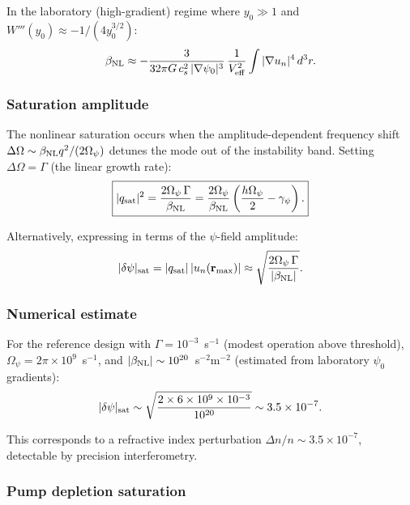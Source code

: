 \documentclass[12pt,aps,prd,twocolumn,superscriptaddress,nofootinbib]{revtex4-2}
\newcommand{\Opsi}{\Omega_\psi}
\newcommand{\gpsi}{\gamma_\psi}
\newcommand{\br}{\mathbf{r}}
\begin{document}
In the laboratory (high-gradient) regime where $y_0 \gg 1$ and
$W'''(y_0) \approx -1/(4y_0^{3/2})$:
\begin{equation}
\beta_{\rm NL} \approx -\frac{3}{32\pi G\,c_s^2\,|\nabla\psi_0|^3}\,
\frac{1}{V_{\rm eff}^2}\int |\nabla u_n|^4\,d^3r.
\label{eq:beta_lab}
\end{equation}

\subsubsection{Saturation amplitude}

The nonlinear saturation occurs when the amplitude-dependent
frequency shift $\Delta\Omega \sim \beta_{\rm NL}q^2/(2\Opsi)$
detunes the mode out of the instability band.  Setting
$\Delta\Omega = \Gamma$ (the linear growth rate):
\begin{equation}
\boxed{
|q_{\rm sat}|^2 = \frac{2\Opsi\,\Gamma}{\beta_{\rm NL}}
= \frac{2\Opsi}{\beta_{\rm NL}}
\left(\frac{h\Opsi}{2} - \gpsi\right).
}
\label{eq:q_sat}
\end{equation}

Alternatively, expressing in terms of the $\psi$-field amplitude:
\begin{equation}
|\delta\psi|_{\rm sat} = |q_{\rm sat}|\,|u_n(\br_{\rm max})|
\approx \sqrt{\frac{2\Opsi\,\Gamma}{|\beta_{\rm NL}|}}.
\label{eq:psi_sat}
\end{equation}

\subsubsection{Numerical estimate}

For the reference design with $\Gamma = 10^{-3}$~s$^{-1}$ (modest
operation above threshold), $\Opsi = 2\pi\times10^9$~s$^{-1}$, and
$|\beta_{\rm NL}| \sim 10^{20}$~s$^{-2}$m$^{-2}$ (estimated from
laboratory $\psi_0$ gradients):
\begin{equation}
|\delta\psi|_{\rm sat} \sim \sqrt{\frac{2\times6\times10^9\times10^{-3}}
{10^{20}}} \sim 3.5\times10^{-7}.
\label{eq:psi_sat_num}
\end{equation}

This corresponds to a refractive index perturbation
$\Delta n/n \sim 3.5\times10^{-7}$, detectable by precision
interferometry.

\subsubsection{Pump depletion saturation}
\end{document}
